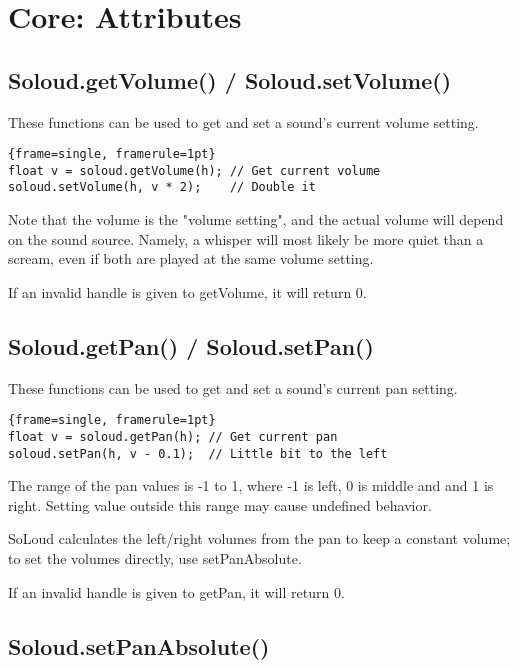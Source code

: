 
\chapter{Core: Attributes}

\section{Soloud.getVolume() / Soloud.setVolume()}

These functions can be used to get and set a sound's current volume setting.

\begin{lstlisting}{frame=single, framerule=1pt}
float v = soloud.getVolume(h); // Get current volume
soloud.setVolume(h, v * 2);    // Double it
\end{lstlisting}

Note that the volume is the "volume setting", and the actual volume will depend on the sound source. Namely, a whisper will most likely be more quiet than a scream, even if both are played at the same volume setting.

If an invalid handle is given to getVolume, it will return 0.

\section{Soloud.getPan() / Soloud.setPan()}

These functions can be used to get and set a sound's current pan setting.

\begin{lstlisting}{frame=single, framerule=1pt}
float v = soloud.getPan(h); // Get current pan
soloud.setPan(h, v - 0.1);  // Little bit to the left
\end{lstlisting}

The range of the pan values is -1 to 1, where -1 is left, 0 is middle and and 1 is right. Setting value outside this range may cause undefined behavior.

SoLoud calculates the left/right volumes from the pan to keep a constant volume; to set the volumes directly, use setPanAbsolute.

If an invalid handle is given to getPan, it will return 0.

\section{Soloud.setPanAbsolute()}

